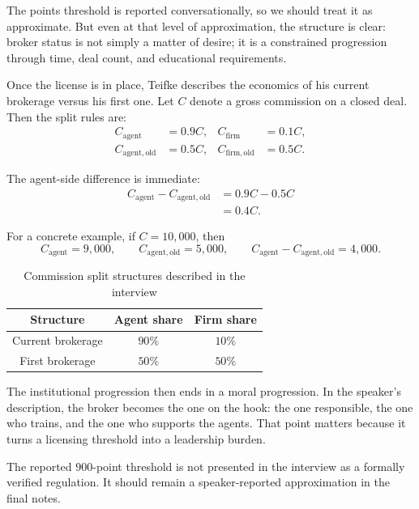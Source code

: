 The points threshold is reported conversationally, so we should treat it as approximate. But even at that level of approximation, the structure is clear: broker status is not simply a matter of desire; it is a constrained progression through time, deal count, and educational requirements.

Once the license is in place, Teifke describes the economics of his current brokerage versus his first one. Let \(C\) denote a gross commission on a closed deal. Then the split rules are:
\begin{align}
C_{\mathrm{agent}} &= 0.9C, &
C_{\mathrm{firm}} &= 0.1C, \\
C_{\mathrm{agent,old}} &= 0.5C, &
C_{\mathrm{firm,old}} &= 0.5C.
\end{align}

The agent-side difference is immediate:
\begin{align}
C_{\mathrm{agent}} - C_{\mathrm{agent,old}}
&= 0.9C - 0.5C \\
&= 0.4C.
\end{align}

For a concrete example, if \(C=10{,}000\), then
\begin{equation}
C_{\mathrm{agent}} = 9{,}000,
\qquad
C_{\mathrm{agent,old}} = 5{,}000,
\qquad
C_{\mathrm{agent}} - C_{\mathrm{agent,old}} = 4{,}000.
\end{equation}

\begin{table}[h]
\centering
\caption{Commission split structures described in the interview}
\begin{tabular}{|c|c|c|}
\hline
Structure & Agent share & Firm share \\
\hline
Current brokerage & \(90\%\) & \(10\%\) \\
First brokerage & \(50\%\) & \(50\%\) \\
\hline
\end{tabular}
\end{table}

The institutional progression then ends in a moral progression. In the speaker's description, the broker becomes the one on the hook: the one responsible, the one who trains, and the one who supports the agents. That point matters because it turns a licensing threshold into a leadership burden.

\begin{remark}
The reported \(900\)-point threshold is not presented in the interview as a formally verified regulation. It should remain a speaker-reported approximation in the final notes.
\end{remark}

